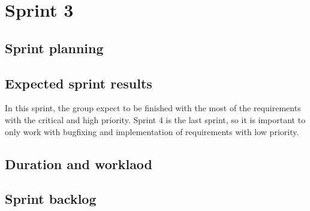 \section{Sprint 3}

\subsection{Sprint planning}

\subsection{Expected sprint results}
	In this sprint, the group expect to be finished with the most of the requirements 
	with the critical and high priority. Sprint 4 is the last sprint, so it is important
	to only work with bugfixing and implementation of requirements with low priority.


\subsection{Duration and worklaod}

\clearpage
\subsection{Sprint backlog}

